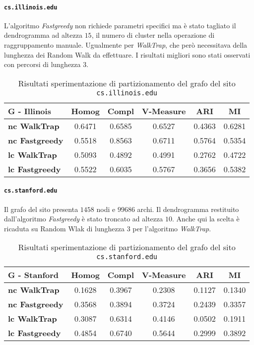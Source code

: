 \paragraph{\texttt{cs.illinois.edu}}L'algoritmo \textit{Fastgreedy} non richiede parametri specifici ma è stato tagliato il dendrogramma ad altezza $15$, il numero di cluster nella operazione di raggruppamento manuale. Ugualmente per \textit{WalkTrap}, che però necessitava della lunghezza dei Random Walk da effettuare. I risultati migliori sono stati osservati con percorsi di lunghezza $3$.
\begin{table}[H]
	\begin{tabular}{| l | c | c | c | c | c |}
	\hline
	\textbf{G - Illinois}  & \textbf{Homog} & \textbf{Compl} & \textbf{V-Measure}  & \textbf{ARI}  & \textbf{MI} \\ [3ex] \hline
	\textbf{nc WalkTrap} & 0.6471 & 0.6585 & 0.6527 & 0.4363 & 0.6281\\ [3ex]
	 \hline
	\textbf{nc Fastgreedy} & 0.5518 & 0.8563 & 0.6711 & 0.5764 & 0.5354\\ [3ex]
	 \hline	
	\textbf{lc WalkTrap} & 0.5093 & 0.4892 & 0.4991 & 0.2762 & 0.4722\\ [3ex]
	 \hline	
	\textbf{lc Fastgreedy} & 0.5522 & 0.6035 & 0.5767 & 0.3656 & 0.5382\\ [3ex]
	\hline
	\end{tabular}
	\caption{Risultati sperimentazione di partizionamento del grafo del sito \texttt{cs.illinois.edu}}
	\label{metricheGraphIll}
\end{table}
 
\paragraph{\texttt{cs.stanford.edu}} Il grafo del sito presenta $1458$ nodi e $99686$ archi. Il dendrogramma restituito dall'algoritmo \textit{Fastgreedy} è stato troncato ad altezza $10$. Anche qui la scelta è ricaduta su Random Wlak di lunghezza $3$ per l'algoritmo \textit{WalkTrap}.

\begin{table}[H]
	\begin{tabular}{| l | c | c | c | c | c |}
	\hline
	\textbf{G - Stanford}  & \textbf{Homog} & \textbf{Compl} & \textbf{V-Measure}  & \textbf{ARI}  & \textbf{MI} \\ [3ex] 
	\hline
	\textbf{nc WalkTrap} & 0.1628 & 0.3967 & 0.2308 & 0.1127 & 0.1340 \\[3ex]
	 \hline
	\textbf{nc Fastgreedy} & 0.3568 & 0.3894 & 0.3724 & 0.2439 & 0.3357 \\[3ex]
	 \hline	
	\textbf{lc WalkTrap} & 0.3087 & 0.6314 & 0.4146 & 0.0502 & 0.1911 \\[3ex]
	 \hline	
	\textbf{lc Fastgreedy} & 0.4854 & 0.6740 & 0.5644 & 0.2999 & 0.3892\\ [3ex]
	\hline
	\end{tabular}
	\caption{Risultati sperimentazione di partizionamento del grafo del sito \texttt{cs.stanford.edu}}
	\label{metricheGraphStanf}
\end{table}
 
